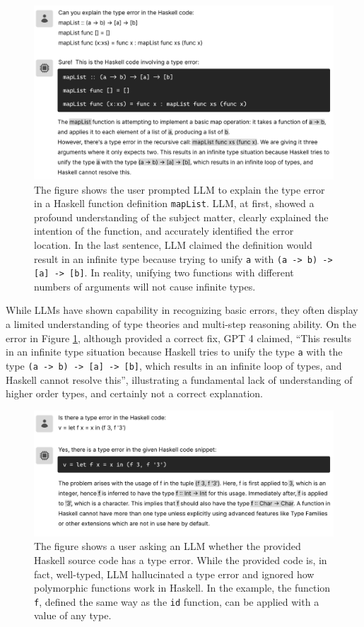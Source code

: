 \begin{figure}[hbt]
  \includegraphics[width=\linewidth]{LLM}
  \caption{\label{fig:llm}
  The figure shows the user prompted LLM to explain the type error in a Haskell function definition \texttt{mapList}. LLM, at first, showed a profound understanding of the subject matter, clearly explained the intention of the function, and accurately identified the error location. In the last sentence, LLM claimed the definition would result in an infinite type because trying to unify \texttt{a} with \texttt{(a -> b) -> [a] -> [b]}. In reality, unifying two functions with different numbers of arguments will not cause infinite types. 
    }
\end{figure}

While LLMs have shown capability in recognizing basic errors, they often display a limited understanding of type theories and multi-step reasoning ability. On the error in Figure \ref{fig:llm}, although provided a correct fix, GPT 4 claimed, “This results in an infinite type situation because Haskell tries to unify the type \texttt{a} with the type \texttt{(a -> b) -> [a] -> [b]}, which results in an infinite loop of types, and Haskell cannot resolve this”, illustrating a fundamental lack of understanding of higher order types, and certainly not a correct explanation.

\begin{figure}[hbt]
  \includegraphics[width=\linewidth]{LLM2}
  \caption{\label{fig:llm2}
  The figure shows a user asking an LLM whether the provided Haskell source code has a type error. While the provided code is, in fact, well-typed, LLM hallucinated a type error and ignored how polymorphic functions work in Haskell. In the example, the function \texttt{f},  defined the same way as the \texttt{id} function, can be applied with a value of any type.
    } 
\end{figure}

